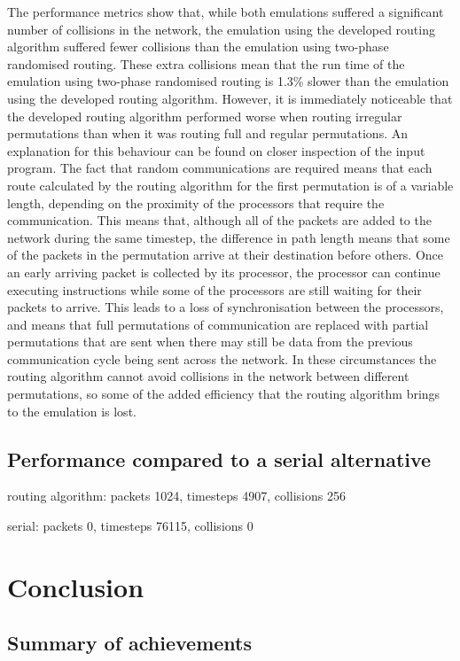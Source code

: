 \documentclass[a4paper, 12pt]{article}
\begin{document}
The performance metrics show that, while both emulations suffered a significant number of collisions in the network, the emulation using the developed routing algorithm suffered fewer collisions than the emulation using two-phase randomised routing. These extra collisions mean that the run time of the emulation using two-phase randomised routing is 1.3\% slower than the emulation using the developed routing algorithm. However, it is immediately noticeable that the developed routing algorithm performed worse when routing irregular permutations than when it was routing full and regular permutations. An explanation for this behaviour can be found on closer inspection of the input program. The fact that random communications are required means that each route calculated by the routing algorithm for the first permutation is of a variable length, depending on the proximity of the processors that require the communication. This means that, although all of the packets are added to the network during the same timestep, the difference in path length means that some of the packets in the permutation arrive at their destination before others. Once an early arriving packet is collected by its processor, the processor can continue executing instructions while some of the processors are still waiting for their packets to arrive. This leads to a loss of synchronisation between the processors, and means that full permutations of communication are replaced with partial permutations that are sent when there may still be data from the previous communication cycle being sent across the network. In these circumstances the routing algorithm cannot avoid collisions in the network between different permutations, so some of the added efficiency that the routing algorithm brings to the emulation is lost.

\subsection{Performance compared to a serial alternative}

routing algorithm:
packets 1024, timesteps 4907, collisions 256

serial:
packets 0, timesteps 76115, collisions 0

\newpage
\section{Conclusion}

\subsection{Summary of achievements}
\end{document}
